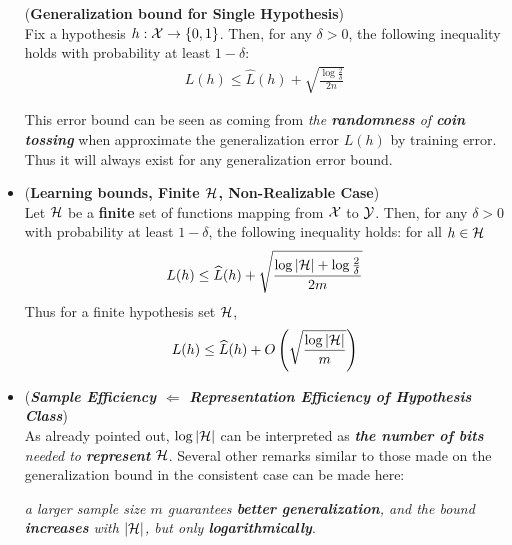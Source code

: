 \documentclass[11pt]{article}
\begin{document}
\begin{itemize}
\begin{corollary} (\textbf{Generalization bound for Single Hypothesis})  \citep{mohri2018foundations}\\
Fix a hypothesis $h: {\mathcal X} \to \left\{0, 1\right\}$. Then, for any $\delta > 0$, the following inequality holds with probability at least $1 - \delta$:
\begin{align}
 L(h) \le  \widehat{L}(h) + \sqrt{\frac{\log\frac{2}{\delta}}{2n}}  \label{eqn: pac_one_hypothesis}
\end{align}
\end{corollary} This error bound can be seen as coming from \emph{the \textbf{randomness} of \textbf{coin tossing}} when approximate the generalization error $L(h)$ by training error. Thus it will always exist for any generalization error bound. 

\item \begin{proposition} (\textbf{Learning bounds, Finite ${\mathcal H}$, Non-Realizable Case}) \citep{mohri2018foundations}\\
Let ${\mathcal H}$ be a \textbf{finite} set of functions mapping from ${\mathcal X}$ to ${\mathcal Y}$.  Then, for any $\delta > 0$ with probability at least $1 - \delta$, the following inequality holds: for all $h \in {\mathcal H}$
\begin{align}
 L(h) \le  \widehat{L}(h) + \sqrt{\frac{\log\left\lvert {\mathcal H} \right\rvert + \log\frac{2}{\delta}}{2m}}  \label{eqn: pac_finite_case_consistency}
\end{align} Thus for a finite hypothesis set ${\mathcal H}$, 
\begin{align}
 L(h) \le  \widehat{L}(h) + O\left(\sqrt{\frac{\log\left\lvert {\mathcal H} \right\rvert}{m}}\right)  \label{eqn: pac_finite_case_consistency_bigO}
\end{align}
\end{proposition}

\item \begin{remark} (\emph{\textbf{Sample Efficiency $\Leftarrow$ Representation Efficiency of Hypothesis Class}})\\
As already pointed out, $\log\left\lvert {\mathcal H} \right\rvert$ can be interpreted as \emph{\textbf{the number of bits} needed to \textbf{represent} ${\mathcal H}$}. Several other remarks similar to those made on the generalization bound in the consistent case can be made here: 

\emph{a larger sample size $m$ guarantees \textbf{better generalization}, and the bound \textbf{increases} with $\left\lvert {\mathcal H} \right\rvert$, but only \textbf{logarithmically}}.


\end{remark}
\end{itemize}
\end{document}

